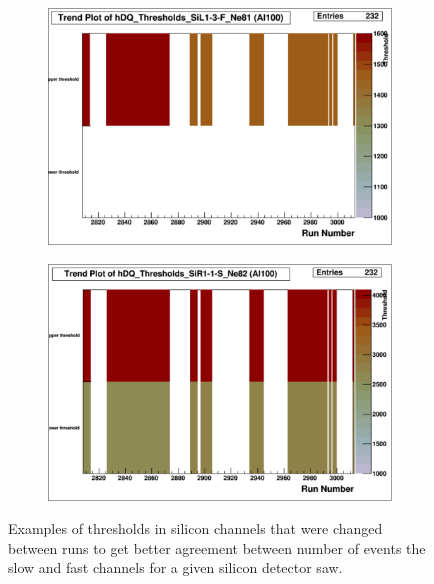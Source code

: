 \documentclass[a4paper]{article}
\begin{document}
\begin{figure}
\begin{subfigure}{0.5\textwidth}
    \caption{}\label{fig:al100_sil12f_thresh}
  \end{subfigure}%
  \begin{subfigure}{0.5\textwidth}
    \includegraphics[width=0.8\linewidth]{figs/al100/sil13f_thresh}
    \caption{}\label{fig:al100_sil13f_thresh}
  \end{subfigure}
  \begin{subfigure}{0.5\textwidth}
    \includegraphics[width=0.8\linewidth]{figs/al100/sir11s_thresh}
    \caption{}\label{fig:al100_sir11s_thresh}
  \end{subfigure}
  \caption{Examples of thresholds in silicon channels that were changed between runs to
    get better agreement between number of events the slow and fast channels for a given
    silicon detector saw.}
  \label{fig:al100_thresholds_change}
\end{figure}
\end{document}
